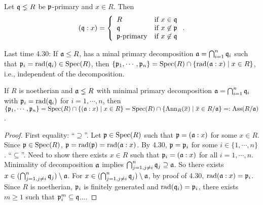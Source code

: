 \begin{proposition}
    Let $\mathfrak{q} \lneq R$ be $\mathfrak{p}$-primary and $x \in R$. Then 
    \[
        (\mathfrak{q}:x) = \left\{
            \begin{array}{ll}
                R &\text{if }x \in \mathfrak{q} \\
                \mathfrak{q} &\text{if }x \not \in \mathfrak{p} \\
                \mathfrak{p}\text{-primary} &\text{if }x \not \in \mathfrak{q} \\
            \end{array}
        \right..
    \]
\end{proposition}

Last time 4.30: If $\mathfrak{a} \leq R$, has a minal primary decomposition $\mathfrak{a} = \bigcap_{i=1}^{n}\mathfrak{q}_i$ such that $\mathfrak{p}_i = \operatorname{rad}(\mathfrak{q}_i) \in \operatorname{Spec}(R)$, then $\{\mathfrak{p}_1,\cdots,\mathfrak{p}_n\} = \operatorname{Spec}(R) \cap \{\operatorname{rad}(\mathfrak{a}:x) \mid x \in R\}$, i.e., independent of the decomposition. 

\begin{theorem}
    If $R$ is noetherian and $\mathfrak{a} \lneq R$ with minimal primary decomposition $\mathfrak{a} = \bigcap_{i=1}^{n} \mathfrak{q}_i$ with $\mathfrak{p}_i = \operatorname{rad}(\mathfrak{q}_i)$ for $i = 1,\cdots,n$, then $\{\ffp_1,\cdots,\ffp_n\} = \operatorname{Spec}(R) \cap \{(\ffa:x) \mid x \in R\} = \operatorname{Spec}(R) \cap \{\operatorname{Ann}_R(\overbar{x}) \mid \overbar{x} \in R/\ffa\} =: \operatorname{Ass}(R/\ffa)$.
\end{theorem}

\begin{proof}
    First equality: ``$\supseteq$''. Let $\mathfrak{p} \in \operatorname{Spec}(R)$ such that $\mathfrak{p} = (\mathfrak{a}:x)$ for some $x \in R$. Since $\mathfrak{p} \in \operatorname{Spec}(R)$, $\mathfrak{p} = \operatorname{rad}(\mathfrak{p}) = \operatorname{rad}(\mathfrak{a}:x)$. By 4.30, $\mathfrak{p} = \mathfrak{p}_i$ for some $i \in \{1,\cdots,n\}$. ``$\subseteq$''. Need to show there exists $x \in R$ such that $\mathfrak{p}_i = (\mathfrak{a}:x)$ for all $i=1,\cdots,n$. Minimality of decomposition $\mathfrak{a}$ implies $\bigcap_{j=1, j \neq i}^{n} \mathfrak{q}_j \supseteq \mathfrak{a}$. So there exists $x \in (\bigcap_{j=1,j \neq i}^{n} \mathfrak{q}_j) \setminus \mathfrak{a}$. For $x \in (\bigcap_{j=1,j \neq i}^{n}\mathfrak{q}_j) \setminus \mathfrak{a}$, by proof of 4.30, $\operatorname{rad}(\mathfrak{a}:x) = \mathfrak{p}_i$. Since $R$ is noetherian, $\mathfrak{p}_i$ is finitely generated and $\operatorname{rad}(\mathfrak{q}_i) = \mathfrak{p}_i$, there exists $m \geq 1$ such that $\mathfrak{p}_i^{m} \subseteq \mathfrak{q}$....  \par  
\end{proof}

